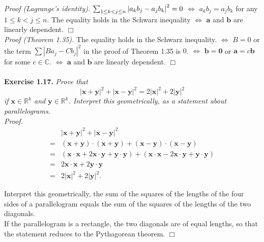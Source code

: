 \documentclass{article}
\begin{document}
\emph{Proof (Lagrange's identity).}
$\sum_{1 \leq k < j \leq n} \abs{ a_k b_j - a_j b_k }^2 = 0$
$\Longleftrightarrow$
$a_k b_j = a_j b_k$ for any $1 \leq k < j \leq n$.
The equality holds in the Schwarz inequality
$\Longleftrightarrow$
$\mathbf{a}$ and $\mathbf{b}$ are linearly dependent.
$\Box$ \\

\emph{Proof (Theorem 1.35).}
The equality holds in the Schwarz inequality.
$\Longleftrightarrow$
$B = 0$ or
the term $\sum |B a_j - C b_j|^2$ in the proof of Theorem 1.35 is $0$.
$\Longleftrightarrow$
$\mathbf{b} = \mathbf{0}$ or $\mathbf{a} = c\mathbf{b}$ for some $c \in \mathbb{C}$.
$\Longleftrightarrow$
$\mathbf{a}$ and $\mathbf{b}$ are linearly dependent.
$\Box$ \\\\






\textbf{Exercise 1.17.}
\emph{Prove that
$$|\mathbf{x}+\mathbf{y}|^2 + |\mathbf{x}-\mathbf{y}|^2
= 2|\mathbf{x}|^2 + 2|\mathbf{y}|^2$$
if $\mathbf{x} \in \mathbb{R}^k$ and $\mathbf{y} \in \mathbb{R}^k$.
Interpret this geometrically,
as a statement about parallelograms.} \\

\emph{Proof.}
\begin{align*}
&|\mathbf{x}+\mathbf{y}|^2 + |\mathbf{x}-\mathbf{y}|^2 \\
=& (\mathbf{x}+\mathbf{y})\cdot(\mathbf{x}+\mathbf{y})
  + (\mathbf{x}-\mathbf{y})\cdot(\mathbf{x}-\mathbf{y}) \\
=& (\mathbf{x}\cdot\mathbf{x} + 2\mathbf{x}\cdot\mathbf{y} + \mathbf{y}\cdot\mathbf{y})
  + (\mathbf{x}\cdot\mathbf{x} - 2\mathbf{x}\cdot\mathbf{y} + \mathbf{y}\cdot\mathbf{y}) \\
=& 2\mathbf{x}\cdot\mathbf{x} + 2\mathbf{y}\cdot\mathbf{y} \\
=& 2|\mathbf{x}|^2 + 2|\mathbf{y}|^2.
\end{align*}

Interpret this geometrically,
the sum of the squares of the lengths of the four sides of a parallelogram
equals the sum of the squares of the lengths of the two diagonals. \\

If the parallelogram is a rectangle, the two diagonals are of equal lengths,
so that the statement reduces to the Pythagorean theorem.
$\Box$ \\\\
\end{document}
